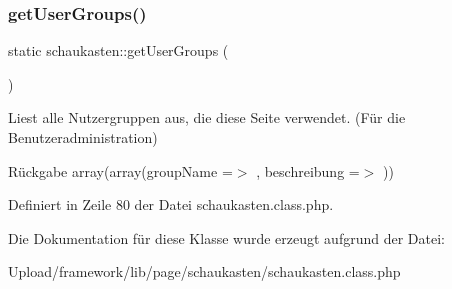 \subsubsection{\texorpdfstring{get\+User\+Groups()}{getUserGroups()}}
{\footnotesize\ttfamily static schaukasten\+::get\+User\+Groups (\begin{DoxyParamCaption}{ }\end{DoxyParamCaption})\hspace{0.3cm}{\ttfamily [static]}}

Liest alle Nutzergruppen aus, die diese Seite verwendet. (Für die Benutzeradministration) \begin{DoxyReturn}{Rückgabe}
array(array(\textquotesingle{}group\+Name\textquotesingle{} =$>$ \textquotesingle{}\textquotesingle{}, \textquotesingle{}beschreibung\textquotesingle{} =$>$ \textquotesingle{}\textquotesingle{})) 
\end{DoxyReturn}


Definiert in Zeile 80 der Datei schaukasten.\+class.\+php.



Die Dokumentation für diese Klasse wurde erzeugt aufgrund der Datei\+:\begin{DoxyCompactItemize}
\item 
Upload/framework/lib/page/schaukasten/schaukasten.\+class.\+php\end{DoxyCompactItemize}
